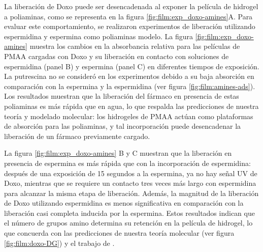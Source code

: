 La liberaci\'on de Doxo puede ser desencadenada al exponer la pel\'icula de hidrogel a poliaminas, como se representa en la figura \ref{fig:film:exp_doxo-amines}A. Para evaluar este comportamiento, se realizaron experimentos de liberaci\'on utilizando espermidina y espermina como poliaminas modelo. La  figura \ref{fig:film:exp_doxo-amines} muestra los cambios en la absorbancia relativa para las pel\'iculas de PMAA cargadas con Doxo y su liberaci\'on en contacto con soluciones de espermidina (panel B) y espermina (panel C) en diferentes tiempos de exposici\'on. La putrescina no se consider\'o en los experimentos debido a su baja absorci\'on en comparaci\'on con la espermina y la espermidina (ver figura \ref{fig:film:amines-ads}). Los resultados muestran que la liberaci\'on del f\'armaco en presencia de estas poliaminas es m\'as r\'apida que en agua, lo que respalda las predicciones de nuestra teor\'ia y modelado molecular: los hidrogeles de PMAA act\'uan como plataformas de absorci\'on para las poliaminas, y tal incorporaci\'on puede desencadenar la liberaci\'on de un f\'armaco previamente cargado.




La figura \ref{fig:film:exp_doxo-amines} B y C muestran que la liberaci\'on en presencia de espermina es m\'as r\'apida que con la incorporaci\'on de espermidina: despu\'es de una exposici\'on de 15 segundos a la espermina, ya no hay se\~nal UV de Doxo, mientras que se requiere un contacto tres veces m\'as largo con espermidina para alcanzar la misma etapa de liberaci\'on. Adem\'as, la magnitud de la liberaci\'on de Doxo utilizando espermidina es menos significativa en comparaci\'on con la liberaci\'on casi completa inducida por la espermina. Estos resultados indican que el n\'umero de grupos amino determina su retenci\'on en la pel\'icula de hidrogel, lo que concuerda con las predicciones de nuestra teor\'ia molecular (ver figura \ref{fig:film:doxo-DG}) y el trabajo de \citet{Schimka2017}.


